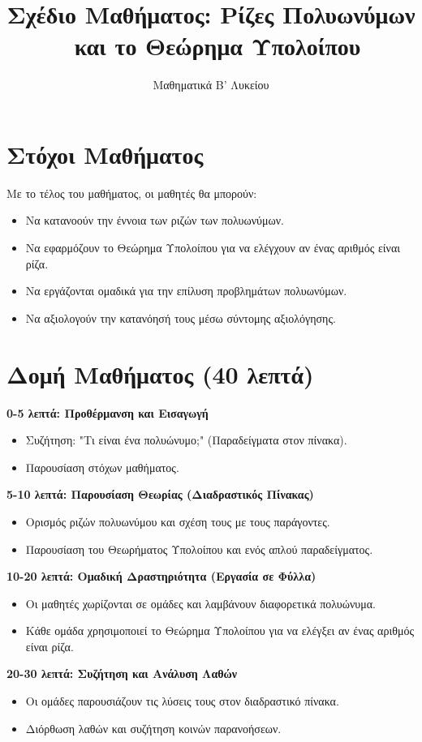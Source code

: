 \documentclass[a4paper,12pt]{article}
\title{\textbf{Σχέδιο Μαθήματος: Ρίζες Πολυωνύμων \ και το Θεώρημα Υπολοίπου}}
\author{Μαθηματικά Β' Λυκείου}
\date{}
\begin{document}
\maketitle

\section*{Στόχοι Μαθήματος}
Με το τέλος του μαθήματος, οι μαθητές θα μπορούν:
\begin{itemize}
  \item Να κατανοούν την έννοια των ριζών των πολυωνύμων.
  \item Να εφαρμόζουν το Θεώρημα Υπολοίπου για να ελέγχουν αν ένας αριθμός είναι ρίζα.
  \item Να εργάζονται ομαδικά για την επίλυση προβλημάτων πολυωνύμων.
  \item Να αξιολογούν την κατανόησή τους μέσω σύντομης αξιολόγησης.
\end{itemize}

\section*{Δομή Μαθήματος (40 λεπτά)}

\textbf{0-5 λεπτά: Προθέρμανση και Εισαγωγή}
\begin{itemize}
  \item Συζήτηση: "Τι είναι ένα πολυώνυμο;" (Παραδείγματα στον πίνακα).
  \item Παρουσίαση στόχων μαθήματος.
\end{itemize}

\textbf{5-10 λεπτά: Παρουσίαση Θεωρίας (Διαδραστικός Πίνακας)}
\begin{itemize}
  \item Ορισμός ριζών πολυωνύμου και σχέση τους με τους παράγοντες.
  \item Παρουσίαση του Θεωρήματος Υπολοίπου και ενός απλού παραδείγματος.
\end{itemize}

\textbf{10-20 λεπτά: Ομαδική Δραστηριότητα (Εργασία σε Φύλλα)}
\begin{itemize}
  \item Οι μαθητές χωρίζονται σε ομάδες και λαμβάνουν διαφορετικά πολυώνυμα.
  \item Κάθε ομάδα χρησιμοποιεί το Θεώρημα Υπολοίπου για να ελέγξει αν ένας αριθμός είναι ρίζα.
\end{itemize}

\textbf{20-30 λεπτά: Συζήτηση και Ανάλυση Λαθών}
\begin{itemize}
  \item Οι ομάδες παρουσιάζουν τις λύσεις τους στον διαδραστικό πίνακα.
  \item Διόρθωση λαθών και συζήτηση κοινών παρανοήσεων.
\end{itemize}
\end{document}
